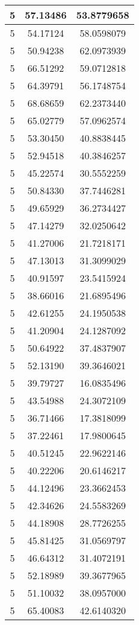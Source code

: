\documentclass[
]{book}
\begin{document}
\begin{tabular}{c|c|c}
\hline
5 & 57.13486 & 53.8779658\\
\hline
5 & 54.17124 & 58.0598079\\
\hline
5 & 50.94238 & 62.0973939\\
\hline
5 & 66.51292 & 59.0712818\\
\hline
5 & 64.39791 & 56.1748754\\
\hline
5 & 68.68659 & 62.2373440\\
\hline
5 & 65.02779 & 57.0962574\\
\hline
5 & 53.30450 & 40.8838445\\
\hline
5 & 52.94518 & 40.3846257\\
\hline
5 & 45.22574 & 30.5552259\\
\hline
5 & 50.84330 & 37.7446281\\
\hline
5 & 49.65929 & 36.2734427\\
\hline
5 & 47.14279 & 32.0250642\\
\hline
5 & 41.27006 & 21.7218171\\
\hline
5 & 47.13013 & 31.3099029\\
\hline
5 & 40.91597 & 23.5415924\\
\hline
5 & 38.66016 & 21.6895496\\
\hline
5 & 42.61255 & 24.1950538\\
\hline
5 & 41.20904 & 24.1287092\\
\hline
5 & 50.64922 & 37.4837907\\
\hline
5 & 52.13190 & 39.3646021\\
\hline
5 & 39.79727 & 16.0835496\\
\hline
5 & 43.54988 & 24.3072109\\
\hline
5 & 36.71466 & 17.3818099\\
\hline
5 & 37.22461 & 17.9800645\\
\hline
5 & 40.51245 & 22.9622146\\
\hline
5 & 40.22206 & 20.6146217\\
\hline
5 & 44.12496 & 23.3662453\\
\hline
5 & 42.34626 & 24.5583269\\
\hline
5 & 44.18908 & 28.7726255\\
\hline
5 & 45.81425 & 31.0569797\\
\hline
5 & 46.64312 & 31.4072191\\
\hline
5 & 52.18989 & 39.3677965\\
\hline
5 & 51.10032 & 38.0957000\\
\hline
5 & 65.40083 & 42.6140320\\

\end{tabular}
\end{document}
